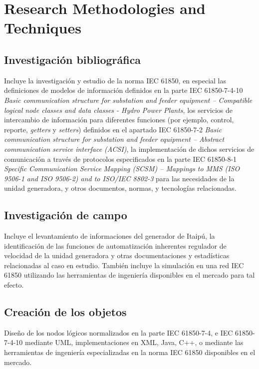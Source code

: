 \section{Research Methodologies and Techniques}
	\subsection{Investigaci\'on bibliogr\'afica} 
		Incluye la investigaci\'on y estudio de la norma IEC 61850, en especial las
		definiciones de modelos de informaci\'on definidos en la parte IEC
		61850-7-4-10 \emph{Basic communication structure for substation and feeder
		equipment – Compatible logical node classes and data classes - Hydro Power
		Plants}, los servicios de intercambio de informaci\'on para diferentes
		funciones (por ejemplo, control, reporte, \emph{getters} y \emph{setters})
		definidos en el apartado IEC 61850-7-2 \emph{Basic communication structure
		for substation and feeder equipment – Abstract communication service
		interface (ACSI)}, la implementaci\'on de dichos servicios de comunicaci\'on
		a trav\'es de protocolos especificados en la parte IEC 61850-8-1
		\emph{Specific Communication Service Mapping (SCSM) – Mappings to MMS (ISO
		9506-1 and ISO 9506-2) and to ISO/IEC 8802-3} para las necesidades de la
		unidad generadora, y otros documentos, normas, y tecnolog\'ias relacionadas.
	\subsection{Investigaci\'on de campo} 
		Incluye el levantamiento de informaciones del generador de Itaip\'u,
		la identificaci\'on de las funciones de automatizaci\'on inherentes regulador
	de velocidad de la unidad generadora y otras documentaciones y estad\'isticas
		relacionadas al caso en estudio. Tambi\'en incluye la simulaci\'on en una
		red IEC 61850 utilizando las herramientas de ingenier\'ia disponibles en el
		mercado para tal efecto.
	\subsection{Creaci\'on de los objetos}
		Dise\~no de los nodos l\'ogicos normalizados en la parte IEC 61850-7-4, e
		IEC 61850-7-4-10 mediante UML, implementaciones en XML, Java, C++, o
		mediante las herramientas de ingenier\'ia especializadas en la norma IEC
		61850 disponibles en el mercado.
